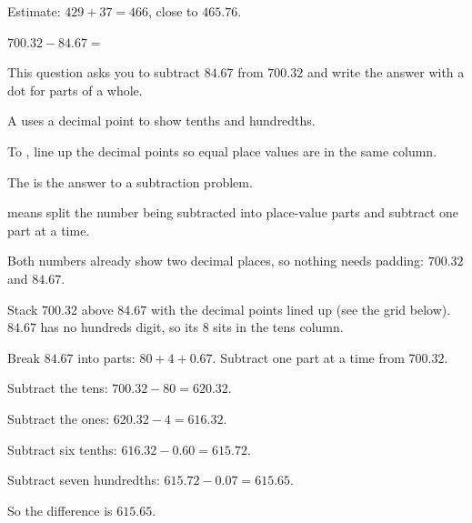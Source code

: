 
\noindent Estimate: $429 + 37 = 466$, close to $465.76$.


\noindent $700.32 - 84.67 = $\ansblank{}


\noindent This question asks you to subtract $84.67$ from $700.32$ and write the
answer with a dot for parts of a whole.

\begin{words}
  \item A uses a decimal point to show tenths and hundredths.
  \item To \unskip, line up the decimal points so equal
        place values are in the same column.
  \item The is the answer to a subtraction problem.
  \item {}means split the number being subtracted into
        place-value parts and subtract one part at a time.
\end{words}

\begin{steps}
  \item Both numbers already show two decimal places, so nothing needs padding:
        $700.32$ and $84.67$.
  \item Stack $700.32$ above $84.67$ with the decimal points lined up (see the
        grid below). $84.67$ has no hundreds digit, so its $8$ sits in the tens
        column.
  \item Break $84.67$ into parts: $80 + 4 + 0.67$. Subtract one part at a time
        from $700.32$.
  \item Subtract the tens: $700.32 - 80 = 620.32$.
  \item Subtract the ones: $620.32 - 4 = 616.32$.
  \item Subtract six tenths: $616.32 - 0.60 = 615.72$.
  \item Subtract seven hundredths: $615.72 - 0.07 = 615.65$.
  \item So the difference is $615.65$.
\end{steps}

